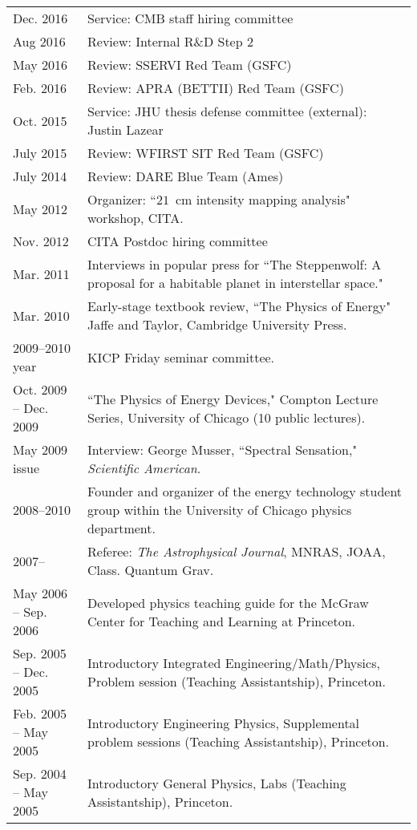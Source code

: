 {\begin{tabular}{l p{12cm}}
Dec. 2016 & Service: CMB staff hiring committee \\
Aug 2016 & Review: Internal R\&D Step 2 \\
May 2016 & Review: SSERVI Red Team (GSFC) \\
Feb. 2016 & Review: APRA (BETTII) Red Team (GSFC) \\
Oct. 2015 & Service: JHU thesis defense committee (external): Justin Lazear \\
July 2015 & Review: WFIRST SIT Red Team (GSFC) \\
July 2014 & Review: DARE Blue Team (Ames) \\
May 2012 & Organizer: ``$21$~cm intensity mapping analysis" workshop, CITA. \\
Nov. 2012 & CITA Postdoc hiring committee \\
Mar. 2011 & Interviews in popular press for ``The Steppenwolf: A proposal for a habitable planet in interstellar space." \\
Mar. 2010  & Early-stage textbook review, ``The Physics of Energy" Jaffe and Taylor, Cambridge University Press. \\
2009--2010 year & KICP Friday seminar committee. \\
Oct. 2009 -- Dec. 2009 & ``The Physics of Energy Devices," Compton Lecture Series, University of Chicago (10 public lectures). \\
May 2009 issue & Interview: George Musser, ``Spectral Sensation," {\it Scientific American}. \\
2008--2010     & Founder and organizer of the energy technology student group within the University of Chicago physics department. \\
2007--         & Referee: {\it The Astrophysical Journal}, MNRAS, JOAA, Class. Quantum Grav. \\
May 2006 -- Sep. 2006 & Developed physics teaching guide for the McGraw Center for Teaching and Learning at Princeton. \\
Sep. 2005 -- Dec. 2005 & Introductory Integrated Engineering/Math/Physics, Problem session (Teaching Assistantship), Princeton. \\ %
Feb. 2005 -- May 2005 & Introductory Engineering Physics, Supplemental problem sessions (Teaching Assistantship), Princeton. \\ %
Sep. 2004 -- May 2005 & Introductory General Physics, Labs (Teaching Assistantship), Princeton. \\ %
\end{tabular} \\~\\~\\
}

